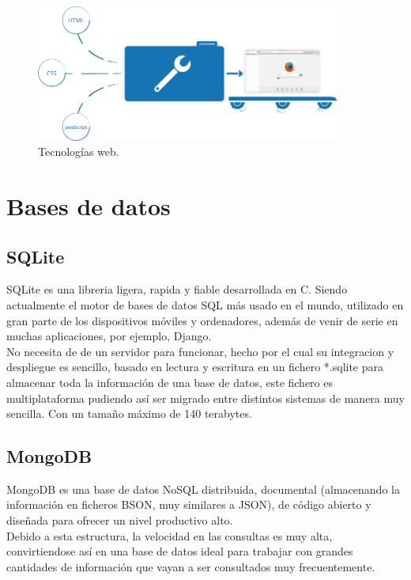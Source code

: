 \documentclass[11pt,a4paper]{book}
\begin{document}
				\begin{figure}
					\centering
					\includegraphics[width=10cm, keepaspectratio]{img/html_css_js.png}
					\caption{Tecnologías web.}
					\label{fig:HTML_CSS_JS}
				\end{figure}
				
				
		\section{Bases de datos}
			\subsection{SQLite}
				SQLite es una libreria ligera, rapida y fiable desarrollada en C. Siendo actualmente el motor de bases de datos SQL más usado en el mundo, utilizado en gran parte de los dispositivos móviles y ordenadores, además de venir de serie en muchas aplicaciones, por ejemplo, Django.\\
				
				
				No necesita de de un servidor para funcionar, hecho por el cual su integracion y despliegue es sencillo, basado en lectura y escritura en un fichero *.sqlite para almacenar toda la información de una base de datos, este fichero es multiplataforma pudiendo así ser migrado entre distintos sistemas de manera muy sencilla. Con un tamaño máximo de 140 terabytes.
				
			\subsection{MongoDB}
				MongoDB es una base de datos NoSQL distribuida, documental (almacenando la información en ficheros BSON, muy similares a JSON), de código abierto y diseñada para ofrecer un nivel productivo alto.\\
				
				Debido a esta estructura, la velocidad en las consultas es muy alta, convirtiendose así en una base de datos ideal para trabajar con grandes cantidades de información que vayan a ser consultados muy frecuentemente.\\
				
\end{document}
